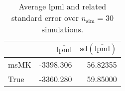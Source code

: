 \begin{table}[H]

\caption{Average lpml and related standard error over $n_{\text{sim}} = 30$ simulations.}
\centering
\begin{tabular}[t]{lrr}
\toprule
  & $\overbar{\text{lpml}}$ & $\text{sd}(\overbar{\text{lpml}})$\\
\midrule
msMK & -3398.306 & 56.82355\\
True & -3360.280 & 59.85000\\
\bottomrule
\end{tabular}
\end{table}